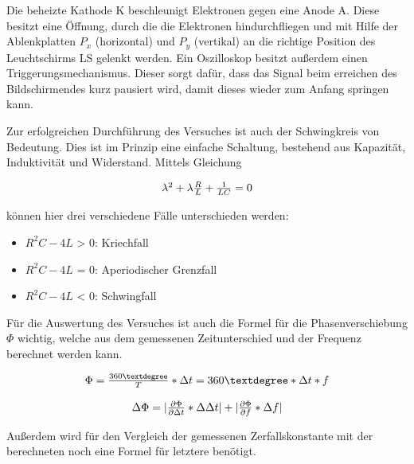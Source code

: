 \documentclass[12pt,a4paper,twoside]{article}
\begin{document}
\noindent
Die beheizte Kathode K beschleunigt Elektronen gegen eine Anode A. Diese besitzt eine Öffnung, durch die die Elektronen hindurchfliegen und mit Hilfe der Ablenkplatten $P_{x}$ (horizontal) und $P_{y}$ (vertikal) an die richtige Position des Leuchtschirms LS gelenkt werden. 
Ein Oszilloskop besitzt außerdem einen Triggerungsmechanismus. Dieser sorgt dafür, dass das Signal beim erreichen des Bildschirmendes kurz pausiert wird, damit dieses wieder zum Anfang springen kann. \newline

\noindent
Zur erfolgreichen Durchführung des Versuches ist auch der Schwingkreis von Bedeutung. Dies ist im Prinzip eine einfache Schaltung, bestehend aus Kapazität, Induktivität und Widerstand.
Mittels Gleichung

    \begin{equation}
        \label{eq:SchwingkreisGleichungFälle}
        \centerline{$\lambda^2 + \lambda \frac{R}{L} + \frac{1}{LC} = 0 $}
    \end{equation}

\noindent
können hier drei verschiedene Fälle unterschieden werden:

\begin{itemize}
    \item $R^2C - 4L$ > 0: Kriechfall
    \item $R^2C - 4L$ = 0: Aperiodischer Grenzfall
    \item $R^2C - 4L$ < 0: Schwingfall
\end{itemize}

\noindent
Für die Auswertung des Versuches ist auch die Formel für die Phasenverschiebung $\Phi$ wichtig, welche aus dem gemessenen Zeitunterschied und der Frequenz berechnet werden kann.

\begin{equation}
    \label{eq:Phasenversatz}
    \centerline{$\Phi = \frac{360°}{T}*\Delta t = 360° * \Delta t * f$}
\end{equation}

\begin{equation}
    \label{eq:UnsicherheitPhasenversatz}
    \centerline{$\Delta \Phi = \vert \frac{\partial \Phi}{\partial \Delta t} * \Delta \Delta t \vert + \vert \frac{\partial \Phi}{\partial f} * \Delta f \vert $}
\end{equation}

\noindent
Außerdem wird für den Vergleich der gemessenen Zerfallskonstante mit der berechneten noch eine Formel für letztere benötigt.
\end{document}
